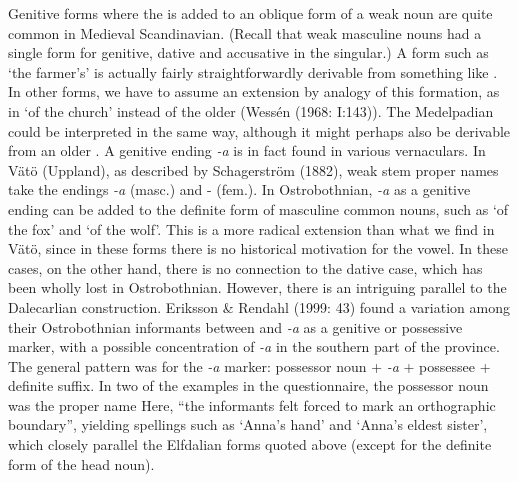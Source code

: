 Genitive forms where the is added to an oblique form of a weak noun are quite common in Medieval Scandinavian. (Recall that weak masculine nouns had a single form for genitive, dative and accusative in the singular.) A form such as  ‘the farmer’s’ is actually fairly straightforwardly derivable from something like . In other forms, we have to assume an extension by analogy of this formation, as in  ‘of the church’ instead of the older  (Wessén (1968: I:143)). The Medelpadian  could be interpreted in the same way, although it might perhaps also be derivable from an older . A genitive ending\textit{ {}-a} is in fact found in various vernaculars. In Vätö (Uppland), as described by Schagerström (1882), weak stem proper names take the endings\textit{ {}-a} (masc.) and \nobreakdash- (fem.). In Ostrobothnian,\textit{ {}-a} as a genitive ending can be added to the definite form of masculine common nouns, such as  ‘of the fox’ and  ‘of the wolf’. This is a more radical extension than what we find in Vätö, since in these forms there is no historical motivation for the  vowel. In these cases, on the other hand, there is no connection to the dative case, which has been wholly lost in Ostrobothnian. However, there is an intriguing parallel to the Dalecarlian construction. Eriksson \& Rendahl (1999: 43) found a variation among their Ostrobothnian informants between and\textit{ {}-a} as a genitive or possessive marker, with a possible concentration of\textit{ {}-a} in the southern part of the province. The general pattern was for the\textit{ {}-a} marker: possessor noun +\textit{ {}-a} + possessee + definite suffix. In two of the examples in the questionnaire, the possessor noun was the proper name Here, “the informants felt forced to mark an orthographic boundary”, yielding spellings such as  ‘Anna’s hand’ and ‘Anna’s eldest sister’, which closely parallel the Elfdalian forms quoted above (except for the definite form of the head noun).

